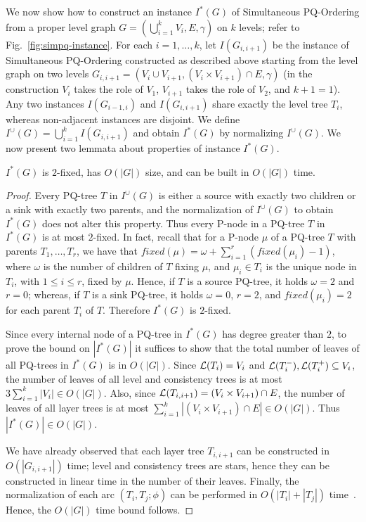 \documentclass{llncs}
\begin{document}
We now show how to construct an instance $I^*(G)$ of {\sc Simultaneous PQ-Ordering} from a proper level graph $G=(\bigcup^k_{i=1} V_i,E,\gamma)$ on $k$ levels; refer to Fig.~\ref{fig:simpq-instance}. For each $i=1,\dots,k$, let $I(G_{i,i+1})$ be the instance of {\sc
  Simultaneous PQ-Ordering} constructed as described above starting from the level graph on two levels $G_{i,i+1}=(V_i \cup V_{i+1}, (V_i \times V_{i+1}) \cap E, \gamma)$ (in the construction $V_i$ takes the role of $V_1$, $V_{i+1}$ takes the role of $V_2$, and  $k+1=1$). Any two instances $I(G_{i-1,i})$ and $I(G_{i,i+1})$ share exactly the level tree $T_i$, whereas non-adjacent instances are disjoint. We define $I^\cup(G)= \bigcup^k_{i=1} I(G_{i,i+1})$ and obtain $I^*(G)$ by normalizing $I^\cup(G)$.  We now present two lemmata about properties of instance $I^*(G)$. 

\begin{lemma} \label{le:construction}
$I^*(G)$ is $2$-fixed, has $O(|G|)$ size, and can be built in $O(|G|)$ time. 
\end{lemma} 

\begin{proof}
  Every PQ-tree $T$ in $I^\cup(G)$ is either a source with exactly two children or a sink with exactly two parents, and the normalization of $I^\cup(G)$ to obtain $I^*(G)$ does not alter this property. Thus every P-node in a PQ-tree $T$ in $I^*(G)$ is at most $2$-fixed.
  In fact, recall that for a P-node $\mu$ of a PQ-tree $T$ with parents $T_1,\dots,T_r$, we have that $fixed(\mu) = \omega + \sum^r_{i=1} (fixed(\mu_i)-1)$, where $\omega$ is the number
of children of $T$ fixing $\mu$, and  $\mu_i \in T_i$ is the unique node in $T_i$, with $1 \leq i \leq r$, fixed by $\mu$. Hence, if $T$ is a source PQ-tree, it holds $\omega = 2$ and $r=0$; whereas, if $T$ is a sink PQ-tree, it holds $\omega = 0$, $r=2$, and $fixed(\mu_i)=2$ for each parent $T_i$ of $T$. Therefore $I^*(G)$ is $2$-fixed.

Since every internal node of a PQ-tree in $I^*(G)$ has degree greater than $2$, to prove the bound on $|I^*(G)|$ it suffices to show that the total number of leaves of all PQ-trees in $I^*(G)$ is in $O(|G|)$. Since ${\cal L}(T_i)=V_i$ and ${\cal L}(T^-_i),{\cal L}(T^+_i)\subseteq
V_i$, the number of leaves of all level and consistency trees is at most $3\sum_{i=1}^k |V_i|\in O(|G|)$. Also, since ${\cal L}(T_{i,i+1})= (V_i \times V_{i+1}) \cap E$, the number of leaves of all layer trees is at most $\sum_{i=1}^k |(V_i \times V_{i+1}) \cap E|\in O(|G|)$. Thus $|I^*(G)|\in O(|G|)$.

We have already observed that each layer tree $T_{i,i+1}$ can be constructed in $O(|G_{i,i+1}|)$ time; level and consistency trees are stars, hence they can be constructed in linear time in the number of their leaves. Finally, the normalization of each arc $(T_i,T_j; \phi)$ can be performed in $O(|T_i|+|T_j|)$ time~\cite{br-spacep-13}. Hence, the $O(|G|)$ time bound follows.  
\end{proof}
\end{document}
